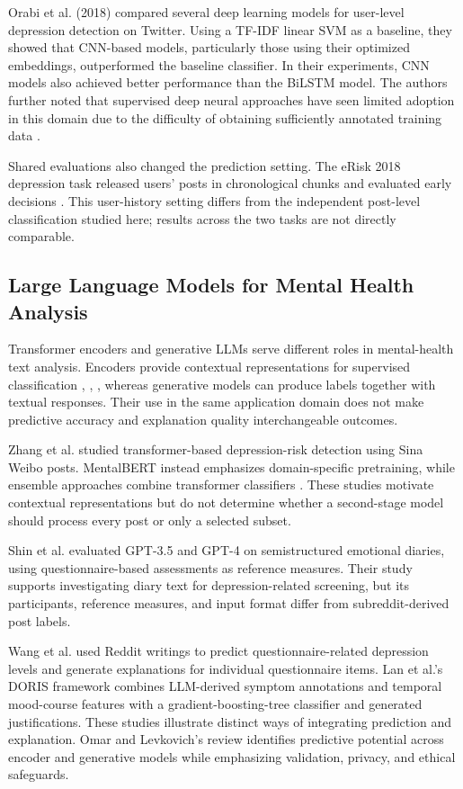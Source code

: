\documentclass{ieeeaccess}
\begin{document}
Orabi et al. (2018) \cite{ref30} compared several deep learning models for user-level depression detection on Twitter. Using a TF-IDF linear SVM as a baseline, they showed that CNN-based models, particularly those using their optimized embeddings, outperformed the baseline classifier. In their experiments, CNN models also achieved better performance than the BiLSTM model. The authors further noted that supervised deep neural approaches have seen limited adoption in this domain due to the difficulty of obtaining sufficiently annotated training data \cite{ref30}.

Shared evaluations also changed the prediction setting. The eRisk 2018 depression task released users' posts in chronological chunks and evaluated early decisions \cite{ref32}. This user-history setting differs from the independent post-level classification studied here; results across the two tasks are not directly comparable.

\subsection{Large Language Models for Mental Health Analysis}

Transformer encoders and generative LLMs serve different roles in mental-health text analysis. Encoders provide contextual representations for supervised classification \cite{ref8}, \cite{ref33}, \cite{ref34}, whereas generative models can produce labels together with textual responses. Their use in the same application domain does not make predictive accuracy and explanation quality interchangeable outcomes.

Zhang et al. \cite{ref33} studied transformer-based depression-risk detection using Sina Weibo posts. MentalBERT \cite{ref8} instead emphasizes domain-specific pretraining, while ensemble approaches combine transformer classifiers \cite{ref34}. These studies motivate contextual representations but do not determine whether a second-stage model should process every post or only a selected subset.

Shin et al. \cite{ref35} evaluated GPT-3.5 and GPT-4 on semistructured emotional diaries, using questionnaire-based assessments as reference measures. Their study supports investigating diary text for depression-related screening, but its participants, reference measures, and input format differ from subreddit-derived post labels.

Wang et al. \cite{ref43} used Reddit writings to predict questionnaire-related depression levels and generate explanations for individual questionnaire items. Lan et al.'s DORIS framework \cite{ref44} combines LLM-derived symptom annotations and temporal mood-course features with a gradient-boosting-tree classifier and generated justifications. These studies illustrate distinct ways of integrating prediction and explanation. Omar and Levkovich's review \cite{ref45} identifies predictive potential across encoder and generative models while emphasizing validation, privacy, and ethical safeguards.
\end{document}
